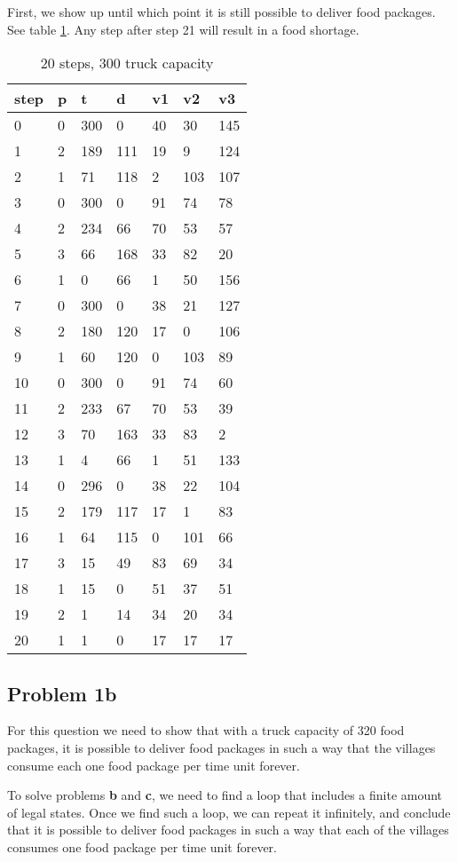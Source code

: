 \documentclass[a4paper]{article}
\begin{document}
	First, we show up until which point it is still possible to deliver food packages. See table \ref{tab:1a}. Any step after step 21 will result in a food shortage.
	\begin{table}[!htb]
		\begin{longtable}[c]{@{}|l|l|l|l|l|l|l|@{}}
			\toprule
			step & p & t & d & v1 & v2 & v3\tabularnewline
			\midrule
			\endhead
			0 & 0 & 300 & 0 & 40 & 30 & 145\tabularnewline
			1 & 2 & 189 & 111 & 19 & 9 & 124\tabularnewline
			2 & 1 & 71 & 118 & 2 & 103 & 107\tabularnewline
			3 & 0 & 300 & 0 & 91 & 74 & 78\tabularnewline
			4 & 2 & 234 & 66 & 70 & 53 & 57\tabularnewline
			5 & 3 & 66 & 168 & 33 & 82 & 20\tabularnewline
			6 & 1 & 0 & 66 & 1 & 50 & 156\tabularnewline
			7 & 0 & 300 & 0 & 38 & 21 & 127\tabularnewline
			8 & 2 & 180 & 120 & 17 & 0 & 106\tabularnewline
			9 & 1 & 60 & 120 & 0 & 103 & 89\tabularnewline
			10 & 0 & 300 & 0 & 91 & 74 & 60\tabularnewline
			11 & 2 & 233 & 67 & 70 & 53 & 39\tabularnewline
			12 & 3 & 70 & 163 & 33 & 83 & 2\tabularnewline
			13 & 1 & 4 & 66 & 1 & 51 & 133\tabularnewline
			14 & 0 & 296 & 0 & 38 & 22 & 104\tabularnewline
			15 & 2 & 179 & 117 & 17 & 1 & 83\tabularnewline
			16 & 1 & 64 & 115 & 0 & 101 & 66\tabularnewline
			17 & 3 & 15 & 49 & 83 & 69 & 34\tabularnewline
			18 & 1 & 15 & 0 & 51 & 37 & 51\tabularnewline
			19 & 2 & 1 & 14 & 34 & 20 & 34\tabularnewline
			20 & 1 & 1 & 0 & 17 & 17 & 17\tabularnewline
			\bottomrule
		\end{longtable}
		\caption{20 steps, 300 truck capacity}
		\label{tab:1a}
	\end{table}
		
	\subsection*{Problem 1b}
	For this question we need to show that with a truck capacity of 320 food packages, it is possible to deliver food packages in such a way that the villages consume each one food package per time unit forever.
	
	To solve problems \textbf{b} and \textbf{c}, we need to find a loop that includes a finite amount of legal states. Once we find such a loop, we can repeat it infinitely, and conclude that it is possible to deliver food packages in such a way that each of the villages consumes one food package per time unit forever.
	
\end{document}
